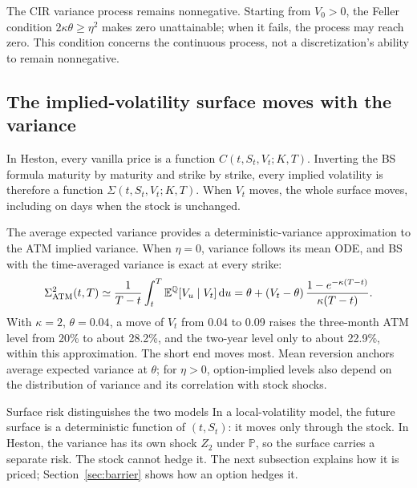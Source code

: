 \documentclass[10pt]{article}
\newcommand{\E}{\mathbb E}\newcommand{\Q}{\mathbb Q}\newcommand{\cF}{\mathcal F}
\newcommand{\dd}{\,\mathrm d}\newcommand{\Pp}{\mathbb P}\newcommand{\Var}{\operatorname{Var}}\newcommand{\Cov}{\operatorname{Cov}}
\theoremstyle{definition}\newtheorem{definition}{Definition}[section]
\begin{document}
The CIR variance process remains nonnegative. Starting from \(V_0>0\),
the Feller condition \(2\kappa\theta\geq\eta^2\) makes zero unattainable;
when it fails, the process may reach zero. This condition concerns the
continuous process, not a discretization's ability to remain nonnegative.

\subsection{The implied-volatility surface moves with the variance}
In Heston, every vanilla price is a function \(C(t,S_t,V_t;K,T)\). Inverting
the BS formula maturity by maturity and strike by strike, every implied
volatility is therefore a function \(\Sigma(t,S_t,V_t;K,T)\). When \(V_t\)
moves, the whole surface moves, including on days when the stock is unchanged.

The average expected variance provides a deterministic-variance approximation
to the ATM implied variance. When \(\eta=0\), variance follows its mean ODE,
and BS with the time-averaged variance is exact at every strike:
\[
\Sigma_{\rm ATM}^2(t,T)\simeq\frac1{T-t}\int_t^T\E^\Q[V_u\mid V_t]\dd u
=\theta+(V_t-\theta)\,\frac{1-e^{-\kappa(T-t)}}{\kappa(T-t)}.
\]
With \(\kappa=2\), \(\theta=0.04\), a move of \(V_t\) from 0.04 to 0.09
raises the three-month ATM level from 20\% to about 28.2\%, and the two-year
level only to about 22.9\%, within this approximation. The short end moves
most. Mean reversion anchors average expected variance at \(\theta\);
for \(\eta>0\), option-implied levels also depend on the distribution of
variance and its correlation with stock shocks.

\begin{keyidea}{Surface risk distinguishes the two models}
In a local-volatility model, the future surface is a deterministic function
of \((t,S_t)\): it moves only through the stock. In Heston, the variance has
its own shock \(Z_2\) under \(\Pp\), so the surface carries a separate risk.
The stock cannot hedge it. The next subsection explains how it is priced;
Section~\ref{sec:barrier} shows how an option hedges it.
\end{keyidea}
\end{document}
